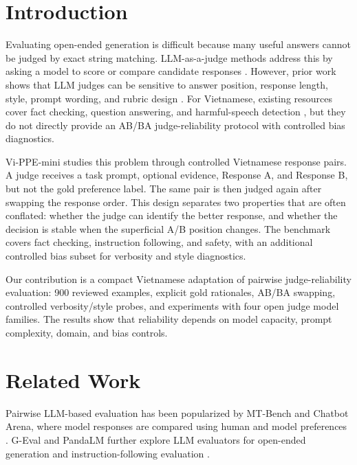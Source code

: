 \documentclass[pdflatex,sn-mathphys-num]{sn-jnl}
\begin{document}
\section{Introduction}

Evaluating open-ended generation is difficult because many useful answers cannot be judged by exact string matching. LLM-as-a-judge methods address this by asking a model to score or compare candidate responses \cite{zheng2023judging,liu2023geval,wang2023pandalm}. However, prior work shows that LLM judges can be sensitive to answer position, response length, style, prompt wording, and rubric design \cite{wang2023faireval,dubois2024length,stureborg2024inconsistent}. For Vietnamese, existing resources cover fact checking, question answering, and harmful-speech detection \cite{vifactcheck,vihsd,viquad}, but they do not directly provide an AB/BA judge-reliability protocol with controlled bias diagnostics.

Vi-PPE-mini studies this problem through controlled Vietnamese response pairs. A judge receives a task prompt, optional evidence, Response A, and Response B, but not the gold preference label. The same pair is then judged again after swapping the response order. This design separates two properties that are often conflated: whether the judge can identify the better response, and whether the decision is stable when the superficial A/B position changes. The benchmark covers fact checking, instruction following, and safety, with an additional controlled bias subset for verbosity and style diagnostics.

Our contribution is a compact Vietnamese adaptation of pairwise judge-reliability evaluation: 900 reviewed examples, explicit gold rationales, AB/BA swapping, controlled verbosity/style probes, and experiments with four open judge model families. The results show that reliability depends on model capacity, prompt complexity, domain, and bias controls.

\section{Related Work}

Pairwise LLM-based evaluation has been popularized by MT-Bench and Chatbot Arena, where model responses are compared using human and model preferences \cite{zheng2023judging,chiang2024arena}. G-Eval and PandaLM further explore LLM evaluators for open-ended generation and instruction-following evaluation \cite{liu2023geval,wang2023pandalm}.
\end{document}
